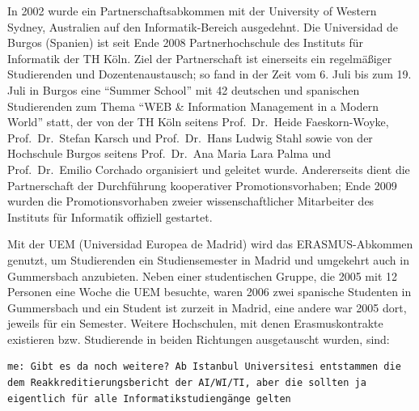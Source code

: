 In 2002 wurde ein Partnerschaftsabkommen mit der University of Western
Sydney, Australien auf den Informatik-Bereich ausgedehnt. Die
Universidad de Burgos (Spanien) ist seit Ende 2008 Partnerhochschule des
Instituts für Informatik der TH Köln. Ziel der Partnerschaft ist
einerseits ein regelmäßiger Studierenden und Dozentenaustausch; so fand
in der Zeit vom 6. Juli bis zum 19. Juli in Burgos eine ``Summer
School'' mit 42 deutschen und spanischen Studierenden zum Thema ``WEB \&
Information Management in a Modern World'' statt, der von der TH Köln
seitens Prof.~Dr.~Heide Faeskorn-Woyke, Prof.~Dr.~Stefan Karsch und
Prof.~Dr.~Hans Ludwig Stahl sowie von der Hochschule Burgos seitens
Prof.~Dr.~Ana Maria Lara Palma und Prof.~Dr.~Emilio Corchado organisiert
und geleitet wurde. Andererseits dient die Partnerschaft der
Durchführung kooperativer Promotionsvorhaben; Ende 2009 wurden die
Promotionsvorhaben zweier wissenschaftlicher Mitarbeiter des Instituts
für Informatik offiziell gestartet.

Mit der UEM (Universidad Europea de Madrid) wird das ERASMUS-Abkommen
genutzt, um Studierenden ein Studiensemester in Madrid und umgekehrt
auch in Gummersbach anzubieten. Neben einer studentischen Gruppe, die
2005 mit 12 Personen eine Woche die UEM besuchte, waren 2006 zwei
spanische Studenten in Gummersbach und ein Student ist zurzeit in
Madrid, eine andere war 2005 dort, jeweils für ein Semester. Weitere
Hochschulen, mit denen Erasmuskontrakte existieren bzw. Studierende in
beiden Richtungen ausgetauscht wurden, sind:

\begin{verbatim}
me: Gibt es da noch weitere? Ab Istanbul Universitesi entstammen die dem Reakkreditierungsbericht der AI/WI/TI, aber die sollten ja eigentlich für alle Informatikstudiengänge gelten
\end{verbatim}

